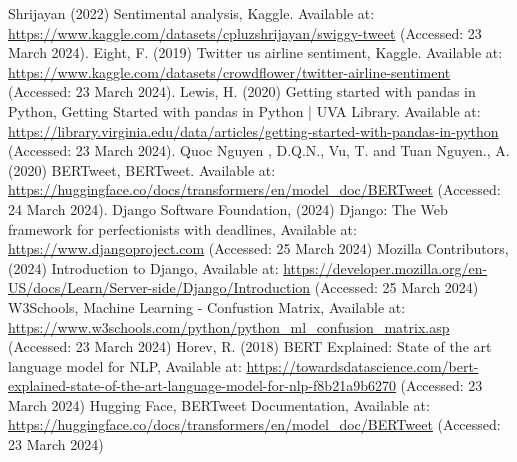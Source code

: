 \documentclass[conference]{IEEEtran}
\begin{document}
\begin{thebibliography}{00}
 Shrijayan (2022) Sentimental analysis, Kaggle. Available at: \url{ https://www.kaggle.com/datasets/cpluzshrijayan/swiggy-tweet} (Accessed: 23 March 2024).  
 Eight, F. (2019) Twitter us airline sentiment, Kaggle. Available at: \url{https://www.kaggle.com/datasets/crowdflower/twitter-airline-sentiment} (Accessed: 23 March 2024). 
 Lewis, H. (2020) Getting started with pandas in Python, Getting Started with pandas in Python | UVA Library. Available at: \url{https://library.virginia.edu/data/articles/getting-started-with-pandas-in-python} (Accessed: 23 March 2024). 
 Quoc Nguyen , D.Q.N.,  Vu, T. and Tuan Nguyen., A. (2020) BERTweet, BERTweet. Available at: \url{https://huggingface.co/docs/transformers/en/model_doc/BERTweet} (Accessed: 24 March 2024). 
 Django Software Foundation, (2024) Django: The Web framework for perfectionists with deadlines, Available at: \url{https://www.djangoproject.com} (Accessed: 25 March 2024)
 Mozilla Contributors, (2024) Introduction to Django, Available at: \url{https://developer.mozilla.org/en-US/docs/Learn/Server-side/Django/Introduction} (Accessed: 25 March 2024)
 W3Schools, Machine Learning - Confustion Matrix, Available at: \url{https://www.w3schools.com/python/python_ml_confusion_matrix.asp} (Accessed: 23 March 2024)
 Horev, R. (2018) BERT Explained: State of the art language model for NLP, Available at: \url{https://towardsdatascience.com/bert-explained-state-of-the-art-language-model-for-nlp-f8b21a9b6270} (Accessed: 23 March 2024)
 Hugging Face, BERTweet Documentation, Available at: \url{https://huggingface.co/docs/transformers/en/model_doc/BERTweet} (Accessed: 23 March 2024)
\end{thebibliography}
\vspace{12pt}
\end{document}
